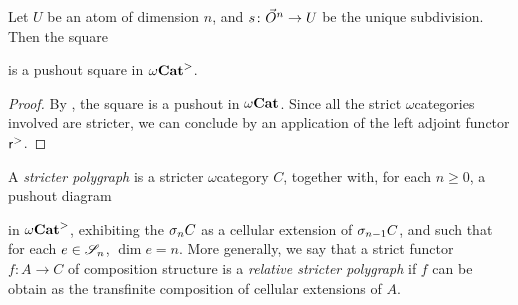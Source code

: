 \begin{lem} \label{lem:pushout_principal_cell}
    Let \( U \) be an atom of dimension \( n \), and \( s \colon \vec{O}^{n} \to U \) be the unique subdivision.
    Then the square
    \begin{center}
    \end{center}
    is a pushout square in \( {\omega\mathbf{Cat}}^> \).
\end{lem}
\begin{proof}
    By \cite[Lemma 9.1.12]{hadzihasanovic2024combinatorics}, the square is a pushout in \( {\omega\mathbf{Cat}} \).
    Since all the strict \( \omega \)\nbd categories involved are stricter, we can conclude by an application of the left adjoint functor \( \mathsf{r}^{>} \). 
\end{proof}

\begin{dfn} 
    A \emph{stricter polygraph} is a stricter \( \omega \)\nbd category \( C \), together with, for each \( n \geq 0 \), a pushout diagram
    \begin{center}
    \end{center}
    in \( {\omega\mathbf{Cat}}^> \), exhibiting the \( \sigma_{n}C \) as a cellular extension of \( \sigma_{n - 1}C \), and such that for each \( e \in \mathscr{S}_n \), \( \dim e = n \).
    More generally, we say that a strict functor \( f \colon A \to C \) of composition structure is a \emph{relative stricter polygraph} if \( f \) can be obtain as the transfinite composition of cellular extensions of \( A \).
\end{dfn}

